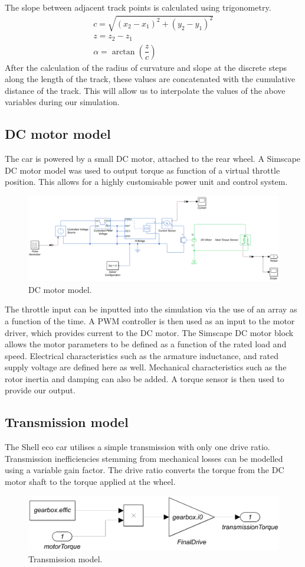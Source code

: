 \documentclass[11pt]{article}
\numberwithin{equation}{section}
\begin{document}
The slope between adjacent track points is calculated using trigonometry.
\begin{gather}
    c = \sqrt{\left(x_2 - x_1\right)^2 + \left(y_2 - y_1\right)^2}\\
    z = z_2 - z_1\\
    \alpha = \arctan\left(\dfrac{z}{c}\right)
\end{gather}
After the calculation of the radius of curvature and slope at the discrete steps along the length of the track, these values are concatenated with the cumulative distance of the track. This will allow us to interpolate the values of the above variables during our simulation. 
\subsection{DC motor model}
The car is powered by a small DC motor, attached to the rear wheel. A Simscape DC motor model was used to output torque as function of a virtual throttle position. This allows for a highly customisable power unit and control system.
\begin{figure}[H]
    \centering
    \includegraphics[width =\textwidth]{./img/DCMotorModel.png}
    \caption{DC motor model.}
\end{figure}
The throttle input can be inputted into the simulation via the use of an array as a function of the time. A PWM controller is then used as an input to the motor driver, which provides current to the DC motor. The Simscape DC motor block allows the motor parameters to be defined as a function of the rated load and speed. Electrical characteristics such as the armature inductance, and rated supply voltage are defined here as well. Mechanical characteristics such as the rotor inertia and damping can also be added. A torque sensor is then used to provide our output.
\subsection{Transmission model}
The Shell eco car utilises a simple transmission with only one drive ratio. Transmission inefficiencies stemming from mechanical losses can be modelled using a variable gain factor. The drive ratio converts the torque from the DC motor shaft to the torque applied at the wheel.
\begin{figure}[H]
    \centering
    \includegraphics[width =\textwidth]{./img/transmissionModel.png}
    \caption{Transmission model.}
\end{figure}
\end{document}
